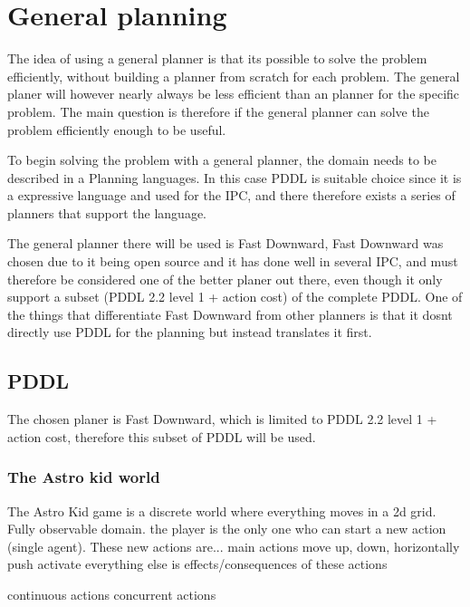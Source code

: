 \section{General planning}
	The idea of using a general planner is that its possible to solve the problem efficiently, without building a planner from scratch for each problem. The general planer will however nearly always be less efficient than an planner for the specific problem. %
	The main question is therefore if the general planner can solve the problem efficiently enough to be useful.

	To begin solving the problem with a general planner, the domain needs to be described in a Planning languages. In this case PDDL is suitable choice since it is a expressive language and used for the IPC, and there therefore exists a series of planners that support the language.
 

	  
	
	The general planner there will be used is Fast Downward, Fast Downward was chosen due to it being open source and it has done well in several IPC, and must therefore be considered one of the better planer out there, even though it only support a subset (PDDL 2.2 level 1 + action cost) of the complete PDDL.
	One of the things that differentiate Fast Downward from other planners is that it dosnt directly use PDDL for the planning but instead translates it first. 
 
 \subsection{PDDL}
	The chosen planer is Fast Downward, which is limited to PDDL 2.2 level 1 + action cost, therefore this subset of PDDL will be used.

	\subsubsection{The Astro kid world}
	The Astro Kid game is a discrete world where everything moves in a 2d grid.
	Fully observable domain.
	the player is the only one who can start a new action (single agent). These new actions are...
			main actions
				move
					up, down, horizontally 
				push
				activate
	everything else is effects/consequences of these actions
	
	continuous actions
	concurrent actions
	


